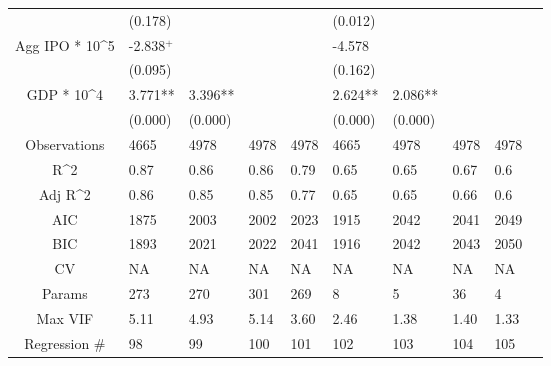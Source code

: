 \documentclass{article}
\begin{document}
\begin{table}[H]
\begin{tabular}{|clllllllll|}
   & (0.178) &  &  &  & (0.012) &  &  &  & \\ 
  Agg IPO * 10^5 & -2.838$^{+}$ &  &  &  & -4.578 &  &  &  & \\ 
   & (0.095) &  &  &  & (0.162) &  &  &  & \\ 
  GDP * 10^4 & 3.771** & 3.396** &  &  & 2.624** & 2.086** &  &  & \\ 
   & (0.000) & (0.000) &  &  & (0.000) & (0.000) &  &  & \\ 
  \hline 
 Observations & 4665 & 4978 & 4978 & 4978 & 4665 & 4978 & 4978 & 4978 & \\ 
  R^2 & 0.87 & 0.86 & 0.86 & 0.79 & 0.65 & 0.65 & 0.67 & 0.6 & \\ 
  Adj R^2 & 0.86 & 0.85 & 0.85 & 0.77 & 0.65 & 0.65 & 0.66 & 0.6 & \\ 
  AIC & 1875 & 2003 & 2002 & 2023 & 1915 & 2042 & 2041 & 2049 & \\ 
  BIC & 1893 & 2021 & 2022 & 2041 & 1916 & 2042 & 2043 & 2050 & \\ 
  CV & NA & NA & NA & NA & NA & NA & NA & NA & \\ 
  Params & 273 & 270 & 301 & 269 & 8 & 5 & 36 & 4 & \\ 
  Max VIF & 5.11 & 4.93 & 5.14 & 3.60 & 2.46 & 1.38 & 1.40 & 1.33 & \\ 
  Regression \# & 98 & 99 & 100 & 101 & 102 & 103 & 104 & 105 & \\ 
   \hline
\end{tabular}
 
\end{table}
\end{document}

